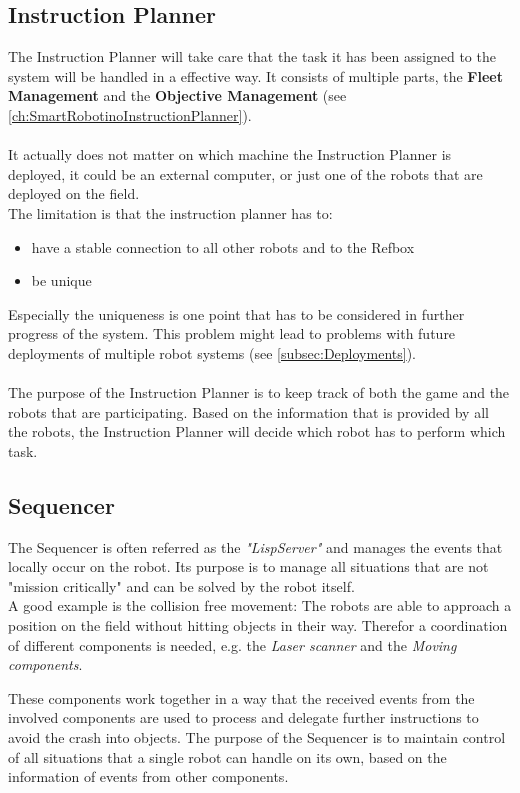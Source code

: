 \subsection{Instruction Planner}
The Instruction Planner will take care that the task it has been assigned to the system will be handled in a effective way. It consists of multiple parts, the \textbf{Fleet Management} and the \textbf{Objective Management} (see \ref{ch:SmartRobotinoInstructionPlanner}). \\
\\
It actually does not matter on which machine the Instruction Planner is deployed, it could be an external computer, or just one of the robots that are deployed on the field.\\
The limitation is that the instruction planner has to:
\begin{itemize}
    \item have a stable connection to all other robots and to the Refbox
    \item be unique
\end{itemize}
Especially the uniqueness is one point that has to be considered in further progress of the system.
This problem might lead to problems with future deployments of multiple robot systems (see \ref{subsec:Deployments}). \\
\\
The purpose of the Instruction Planner is to keep track of both the game and the robots that are participating.
Based on the information that is provided by all the robots, the Instruction Planner will decide which robot has to perform which task.

\subsection{Sequencer}
The Sequencer is often referred as the \textit{"LispServer"} and manages the events that locally occur on the robot.
Its purpose is to manage all situations that are not "mission critically" and can be solved by the robot itself. \\
A good example is the collision free movement: The robots are able to approach a position on the field without hitting objects in their way. Therefor a coordination of different components is needed, e.g. the \textit{Laser scanner} and the \textit{Moving components}.

These components work together in a way that the received events from the involved components are used to process and delegate further instructions to avoid the crash into objects.
The purpose of the Sequencer is to maintain control of all situations that a single robot can handle on its own, based on the information of events from other components.

